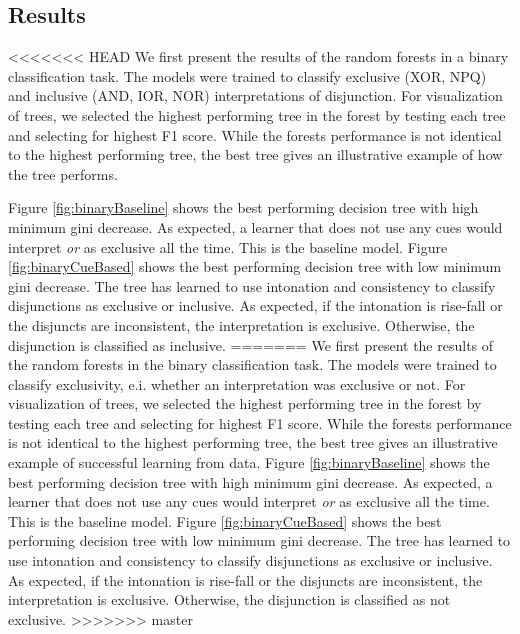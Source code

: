 \documentclass[,man,floatsintext]{apa6}
\begin{document}
\hypertarget{results-1}{%
\subsection{Results}\label{results-1}}

<<<<<<< HEAD
We first present the results of the random forests in a binary classification task. The models were trained to classify exclusive (XOR, NPQ) and inclusive (AND, IOR, NOR) interpretations of disjunction. For visualization of trees, we selected the highest performing tree in the forest by testing each tree and selecting for highest F1 score. While the forests performance is not identical to the highest performing tree, the best tree gives an illustrative example of how the tree performs.

Figure \ref{fig:binaryBaseline} shows the best performing decision tree with high minimum gini decrease. As expected, a learner that does not use any cues would interpret \emph{or} as exclusive all the time. This is the baseline model. Figure \ref{fig:binaryCueBased} shows the best performing decision tree with low minimum gini decrease. The tree has learned to use intonation and consistency to classify disjunctions as exclusive or inclusive. As expected, if the intonation is rise-fall or the disjuncts are inconsistent, the interpretation is exclusive. Otherwise, the disjunction is classified as inclusive.
=======
We first present the results of the random forests in the binary classification task. The models were trained to classify exclusivity, e.i. whether an interpretation was exclusive or not. For visualization of trees, we selected the highest performing tree in the forest by testing each tree and selecting for highest F1 score. While the forests performance is not identical to the highest performing tree, the best tree gives an illustrative example of successful learning from data. Figure \ref{fig:binaryBaseline} shows the best performing decision tree with high minimum gini decrease. As expected, a learner that does not use any cues would interpret \emph{or} as exclusive all the time. This is the baseline model. Figure \ref{fig:binaryCueBased} shows the best performing decision tree with low minimum gini decrease. The tree has learned to use intonation and consistency to classify disjunctions as exclusive or inclusive. As expected, if the intonation is rise-fall or the disjuncts are inconsistent, the interpretation is exclusive. Otherwise, the disjunction is classified as not exclusive.
>>>>>>> master
\end{document}
